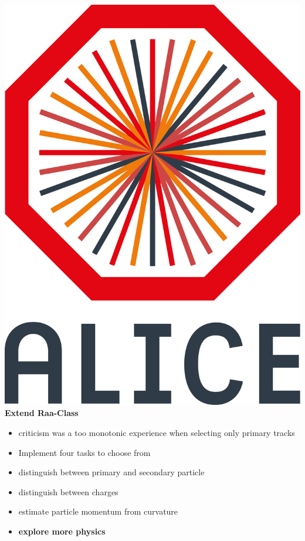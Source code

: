 \documentclass[aspectratio=169,14pt,dvipsnames]{beamer}
\begin{document}
\begin{frame}{\includegraphics[height=0.07\textheight]{2012-Jul-04-4_Color_Logo_CB.png} \hspace{0.2cm}\textbf{Extend Raa-Class}}
  \begin{itemize}
    \item<1-> criticism was a too monotonic experience when selecting only primary tracks
    \item<2-> Implement four tasks to choose from
    \item<2-> distinguish between primary and secondary particle
    \item<2-> distinguish between charges
    \item<2-> estimate particle momentum from curvature
    \item<3-> \textbf{explore more physics}
  \end{itemize}
\end{frame}
\end{document}

